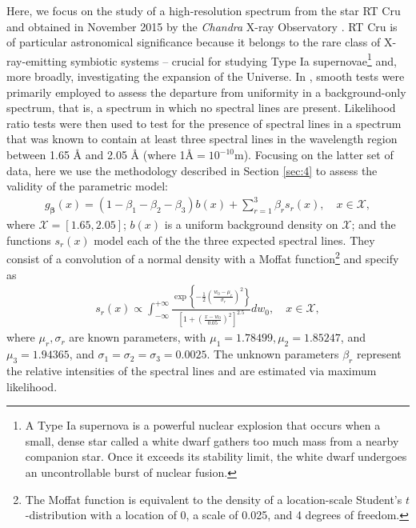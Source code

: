\documentclass[11pt]{article}
\newcommand{\vect}[1]{\boldsymbol{#1}}
\begin{document}
Here, we focus on the study of a high-resolution spectrum from the star RT Cru and obtained in November 2015 by the \textit{Chandra} X-ray Observatory \citep{swartz}. RT Cru is of particular astronomical significance because it belongs to the rare class of X-ray-emitting symbiotic systems --  crucial for studying Type Ia supernovae\footnote{A Type Ia supernova is a powerful nuclear explosion that occurs when a small, dense star called a white dwarf gathers too much mass from a nearby companion star. Once it exceeds its stability limit, the white dwarf undergoes an uncontrollable burst of nuclear fusion.} and, more broadly, investigating the expansion of the Universe. 
In \cite{zhang2023}, smooth tests were primarily employed to assess the departure from uniformity in a background-only spectrum, that is, a spectrum in which no spectral lines are present. Likelihood ratio tests were then used to test for the presence of spectral lines in a spectrum that was known to contain at least three spectral lines in the wavelength region between 1.65 Å and 2.05 Å (where 1Å$= 10^{-10}$m). 
Focusing on the latter set of data, here we use the methodology described in Section \ref{sec:4} to assess the validity of the parametric model: 
\begin{equation}
    \begin{aligned}
g_{\vect{\beta}}(x) =  (1- \beta_{1}-\beta_{2}-\beta_{3}) b(x) + \sum\limits_{r=1}^3 \beta_r s_{r}(x), \quad x\in  \mathcal{X},
    \label{eqn:trueg}
    \end{aligned}    
\end{equation}
where $\mathcal{X}=[1.65,2.05]$; $b(x)$ is a uniform background density on $\mathcal{X}$; and the functions $s_r(x)$ model each of the the three expected spectral lines. They consist of a convolution of a normal density with a Moffat function\footnote{The Moffat function is equivalent to the density of a location-scale Student’s $t$-distribution with a location of 0, a scale of 0.025, and 4 degrees of freedom. } \citep[][]{1969moffat} and specify as 
\begin{equation}
   \begin{aligned}
s_r\left(x\right) \propto \int_{-\infty}^{+\infty}  \frac{\exp \left\{-\frac{1}{2}\left(\frac{w_0-\mu_r}{\sigma_r}\right)^2\right\}}{\left[1+\left(\frac{x-w_0}{0.05}\right)^2\right]^{2.5}} d w_0, \quad x\in\mathcal{X},
   \end{aligned}    
   \label{eq:LRF}
\end{equation}
where $\mu_r, \sigma_r$ are known parameters, with $\mu_1 = 1.78499, \mu_2 = 1.85247$, and $\mu_3 = 1.94365$, and $\sigma_1=\sigma_2=\sigma_3 = 0.0025$. The unknown parameters $\beta_{r}$ represent the relative intensities of the spectral lines and are estimated via maximum likelihood.
\end{document}
